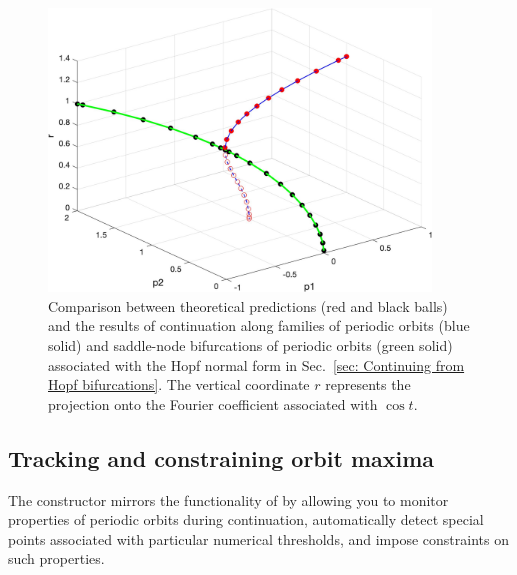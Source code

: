 \begin{figure}[h]
\centering
\includegraphics[width=4in]{Figures/Section7_3_1.jpg}
\caption{Comparison between theoretical predictions (red and black balls) and the results of continuation along families of periodic orbits (blue solid) and saddle-node bifurcations of periodic orbits (green solid) associated with the Hopf normal form in Sec.~\ref{sec: Continuing from Hopf bifurcations}. The vertical coordinate $r$ represents the projection onto the Fourier coefficient associated with $\cos t$.}
\label{fig: Section7_3_1}
\end{figure}

\subsection{Tracking and constraining orbit maxima}
\label{sec: Tracking and constraining orbit maxima}

The  constructor mirrors the functionality of  by allowing you to monitor properties of periodic orbits during continuation, automatically detect special points associated with particular numerical thresholds, and impose constraints on such properties.

